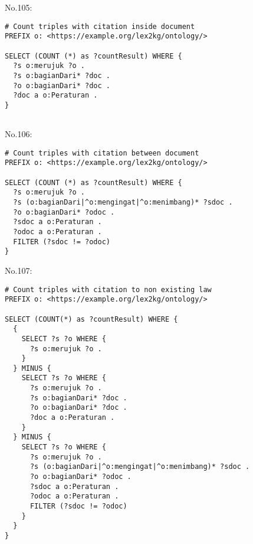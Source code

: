 \noindent No.105:
\begin{lstlisting}
# Count triples with citation inside document
PREFIX o: <https://example.org/lex2kg/ontology/>

SELECT (COUNT (*) as ?countResult) WHERE {
  ?s o:merujuk ?o .
  ?s o:bagianDari* ?doc .
  ?o o:bagianDari* ?doc .
  ?doc a o:Peraturan .
} 


\end{lstlisting}


\noindent No.106:
\begin{lstlisting}
# Count triples with citation between document
PREFIX o: <https://example.org/lex2kg/ontology/>

SELECT (COUNT (*) as ?countResult) WHERE {
  ?s o:merujuk ?o .
  ?s (o:bagianDari|^o:mengingat|^o:menimbang)* ?sdoc .
  ?o o:bagianDari* ?odoc .
  ?sdoc a o:Peraturan .
  ?odoc a o:Peraturan .
  FILTER (?sdoc != ?odoc)
} 

\end{lstlisting}


\noindent No.107:
\begin{lstlisting}
# Count triples with citation to non existing law
PREFIX o: <https://example.org/lex2kg/ontology/>

SELECT (COUNT(*) as ?countResult) WHERE {
  {
    SELECT ?s ?o WHERE {
      ?s o:merujuk ?o .
    }
  } MINUS {
    SELECT ?s ?o WHERE {
      ?s o:merujuk ?o .
      ?s o:bagianDari* ?doc .
      ?o o:bagianDari* ?doc .
      ?doc a o:Peraturan .
    }
  } MINUS {
    SELECT ?s ?o WHERE {
      ?s o:merujuk ?o .
      ?s (o:bagianDari|^o:mengingat|^o:menimbang)* ?sdoc .
      ?o o:bagianDari* ?odoc .
      ?sdoc a o:Peraturan .
      ?odoc a o:Peraturan .
      FILTER (?sdoc != ?odoc)
    }
  }
} 

\end{lstlisting}
